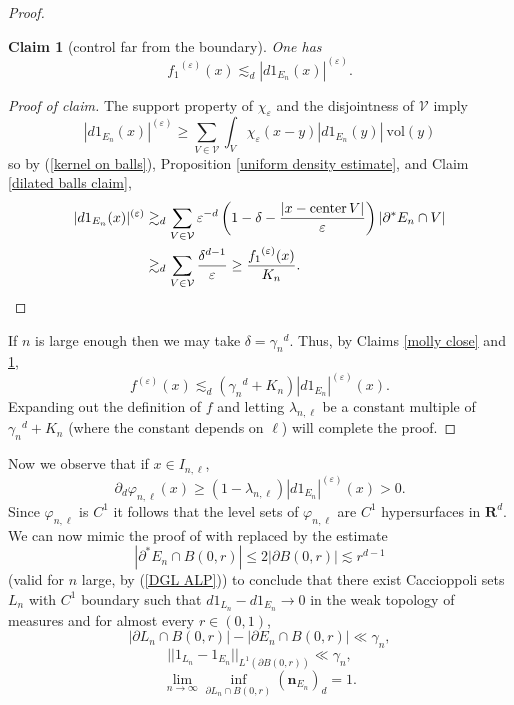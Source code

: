 \documentclass[reqno,12pt,letterpaper]{amsart}
\newcommand{\RR}{\mathbf{R}}
\DeclareMathOperator{\cent}{center}
\newcommand{\normal}{\mathbf n}
\newcommand{\vol}{\mathrm{vol}}
\newtheorem{claim}[theorem]{Claim}
\theoremstyle{definition}
\numberwithin{equation}{section}
\begin{document}
\begin{proof}
\begin{claim}[control far from the boundary]\label{molly far}
One has
$${f_1}^{(\varepsilon)}(x) \lesssim_d |d1_{E_n}(x)|^{(\varepsilon)}.$$
\end{claim}
\begin{proof}[Proof of claim]
The support property of $\chi_\varepsilon$ and the disjointness of $\mathcal V$ imply
$$|d1_{E_n}(x)|^{(\varepsilon)} \geq \sum_{V \in \mathcal V} \int_V \chi_\varepsilon(x - y) |d1_{E_n}(y)| ~\vol(y)$$
so by (\ref{kernel on balls}), Proposition \ref{uniform density estimate}, and Claim \ref{dilated balls claim},
\begin{align*}
|d1_{E_n}(x)|^{(\varepsilon)} &\gtrsim_d \sum_{V \in \mathcal V} \varepsilon^{-d} \left(1 - \delta - \frac{|x - \cent V|}{\varepsilon}\right) |\partial^* E_n \cap V|\\
& \gtrsim_d \sum_{V \in \mathcal V} \frac{\delta^{d - 1}}{\varepsilon} \geq \frac{{f_1}^{(\varepsilon)}(x)}{K_n}. \qedhere
\end{align*}
\end{proof}

If $n$ is large enough then we may take $\delta = {\gamma_n}^d$. Thus, by Claims \ref{molly close} and \ref{molly far},
$$f^{(\varepsilon)}(x) \lesssim_d ({\gamma_n}^d + K_n)|d1_{E_n}|^{(\varepsilon)}(x).$$
Expanding out the definition of $f$ and letting $\lambda_{n,\ell}$ be a constant multiple of ${\gamma_n}^d + K_n$ (where the constant depends on $\ell$) will complete the proof.
\end{proof}

Now we observe that if $x \in I_{n, \ell}$,
$$\partial_d \varphi_{n,\ell}(x) \geq (1 - \lambda_{n, \ell}) |d1_{E_n}|^{(\varepsilon)}(x) > 0.$$
Since $\varphi_{n, \ell}$ is $C^1$ it follows that the level sets of $\varphi_{n, \ell}$ are $C^1$ hypersurfaces in $\RR^d$.
We can now mimic the proof of \cite[(7.22--7.23)]{Giusti77} with \cite[(5.14)]{Giusti77} replaced by the estimate
\begin{equation}\label{Giusti514}
|\partial^* E_n \cap B(0, r)| \leq 2|\partial B(0, r)| \lesssim r^{d - 1}
\end{equation}
(valid for $n$ large, by (\ref{DGL ALP})) to conclude that there exist Caccioppoli sets $L_n$ with $C^1$ boundary such that $d1_{L_n} - d1_{E_n} \to 0$ in the weak topology of measures and for almost every $r \in (0, 1)$,
\begin{equation}\label{Giusti722}
|\partial L_n \cap B(0, r)| - |\partial E_n \cap B(0, r)| \ll \gamma_n,
\end{equation}
\begin{equation}\label{Giusti723}
||1_{L_n} - 1_{E_n}||_{L^1(\partial B(0, r))} \ll \gamma_n,
\end{equation}
\begin{equation}\label{Giusti717}
\lim_{n \to \infty} \inf_{\partial L_n \cap B(0, r)} (\normal_{E_n})_d = 1.
\end{equation}
\end{document}
